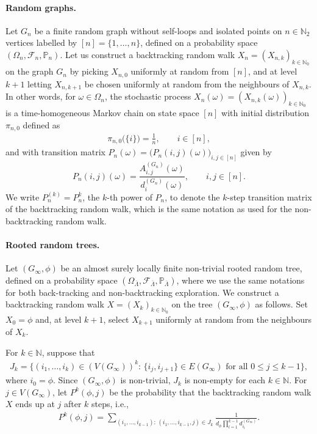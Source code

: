 \documentclass[11pt]{article}
\numberwithin{equation}{section}
\theoremstyle{plain}
\newcommand{\N}{\mathbb N}
\renewcommand{\P}{\mathbb P}
\begin{document}

\paragraph{Random graphs.} 

Let $G_{n}$ be a finite random graph without self-loops and isolated points on $n\in\N_{2}$ vertices labelled by $[n] = \{1,\ldots,n\}$, defined on a probability space $(\Omega_{n},\mathcal{F}_{n},\P_{n})$. Let us construct a backtracking random walk $X_{n}=(X_{n,k})_{k\in\N_0}$ on the graph $G_{n}$ by picking $X_{n,0}$ uniformly at random from $[n]$, and at level $k+1$ letting $X_{n,k+1}$ be chosen uniformly at random from the neighbours of $X_{n,k}$. In other words, for $\omega\in \Omega_{n}$, the stochastic process $X_{n}(\omega)=(X_{n,k}(\omega))_{k\in\N_{0}}$ is a time-homogeneous Markov chain on state space $[n]$ with initial distribution $\pi_{n,0}$ defined as
\begin{align*}
\pi_{n,0}\big(\{i\}\big) = \frac{1}{n}, \qquad i\in[n],
\end{align*}
and with transition matrix $P_{n}(\omega)=\big(P_{n}(i,j)(\omega)\big)_{i,j\in[n]}$ given by
\begin{equation}
\label{BT-transition}
P_{n}(i,j)(\omega) = \frac{A_{i,j}^{(G_{n})}(\omega)}{d_{i}^{(G_{n})}(\omega)}, \qquad i,j\in[n].
\end{equation}
We write $P_{n}^{(k)} = P_{n}^{k}$, the $k$-th power of $P_n$, to denote the $k$-step transition matrix of the backtracking random walk, which is the same notation as used for the non-backtracking random walk.  


\paragraph{Rooted random trees.} 
Let $(G_{\infty},\phi)$ be an almost surely locally finite non-trivial rooted random tree, defined on a probability space $(\Omega_{\bar{\Lambda}},\mathcal{F}_{\bar{\Lambda}},\P_{\bar{\Lambda}})$, where we use the same notations for both back-tracking and non-backtracking exploration. We construct a backtracking random walk $X=(X_{k})_{k\in\N_0}$ on the tree $(G_{\infty},\phi)$ as follows. Set $X_{0} = \phi$ and, at level $k+1$, select $X_{k+1}$ uniformly at random from the neighbours of $X_{k}$. 

For $k\in\N$, suppose that
\begin{align*}
J_{k} = \Big\{(i_{1},\ldots ,i_{k})\in (V(G_{\infty}))^{k}\colon\,\{i_{j} ,i_{j+1}\} \in E(G_{\infty}) 
\text{ for all } 0\leq j\leq k-1\Big\},
\end{align*}
where $i_{0} = \phi$. Since $(G_{\infty},\phi)$ is non-trivial, $J_{k}$ is non-empty for each $k\in\N$. For $j \in V(G_{\infty})$, let $P^{k}(\phi,j)$ be the probability that the backtracking random walk $X$ ends up at $j$ after $k$ steps, i.e.,
\begin{align*}
P^{k}(\phi, j) = \sum_{(i_{1},\ldots, i_{k-1})\colon\,(i_{1},\ldots,i_{k-1},j) \in J_{k}}  
\frac{1}{d_{\phi}\prod_{l=1}^{k-1}d^{(G_\infty)}_{i_{l}}}.
\end{align*}
\end{document}
